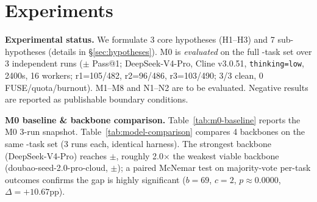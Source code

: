 \section{Experiments}
\label{sec:experiments}

{\sloppy \textbf{Experimental status.} We formulate 3 core hypotheses (H1--H3) and 7 sub-hypotheses (details in \S\ref{sec:hypotheses}). M0 is \emph{evaluated} on the full \Ncases{}-task set over 3 independent runs (\MzeroPass{}$\pm$\MzeroStd{} Pass@1; DeepSeek-V4-Pro, Cline v3.0.51, \texttt{thinking=low}, 2400s, 16 workers; r1=105/482, r2=96/486, r3=103/490; 3/3 clean, 0 FUSE/quota/burnout). M1--M8 and N1--N2 are to be evaluated. Negative results are reported as publishable boundary conditions.\par}

\textbf{M0 baseline \& backbone comparison.} Table~\ref{tab:m0-baseline} reports the M0 3-run snapshot. Table~\ref{tab:model-comparison} compares 4 backbones on the same \Ncases{}-task set (3 runs each, identical harness). The strongest backbone (DeepSeek-V4-Pro) reaches \MzeroPass{}$\pm$\MzeroStd{}, roughly 2.0$\times$ the weakest viable backbone (doubao-seed-2.0-pro-cloud, \DoubaoPro{}$\pm$\DoubaoProStd{}); a paired McNemar test on majority-vote per-task outcomes confirms the gap is highly significant ($b=69$, $c=2$, $p\approx 0.0000$, $\Delta{=}+10.67$pp).

